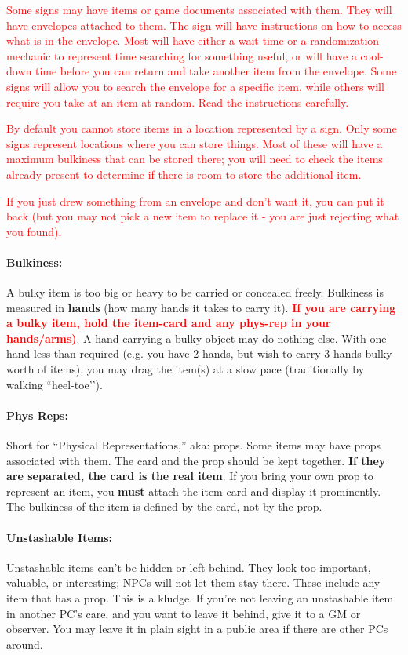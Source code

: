 \documentclass[sheet]{GL2020}
\begin{document}
\textcolor{red}{Some signs may have items or game documents associated with them. They will have envelopes attached to them. The sign will have instructions on how to access what is in the envelope. Most will have either a wait time or a randomization mechanic to represent time searching for something useful, or will have a cool-down time before you can return and take another item from the envelope. Some signs will allow you to search the envelope for a specific item, while others will require you take at an item at random. Read the instructions carefully.}

\textcolor{red}{By default you cannot store items in a location represented by a sign. Only some signs represent locations where you can store things. Most of these will have a maximum bulkiness that can be stored there; you will need to check the items already present to determine if there is room to store the additional item.}

\textcolor{red}{If you just drew something from an envelope and don't want it, you can put it back (but you may not pick a new item to replace it - you are just rejecting what you found).}

\paragraph{Bulkiness:} A bulky item is too big or heavy to be carried or concealed freely.  Bulkiness is measured in {\bf hands} (how many hands it takes to carry it).  \textcolor{red}{\textbf{If you are carrying a bulky item, hold the item-card and any phys-rep in your hands/arms)}}.  A hand carrying a bulky object may do nothing else.  With one hand less than required (e.g. you have 2 hands, but wish to carry 3-hands bulky worth of items), you may drag the item(s) at a slow pace (traditionally by walking ``heel-toe'’).

\paragraph{Phys Reps:} Short for ``Physical Representations,'' aka: props. Some items may have props associated with them.  The card and the prop should be kept together. \textbf{If they are separated, the card is the real item}. If you bring your own prop to represent an item, you \textbf{must} attach the item card and display it prominently. The bulkiness of the item is defined by the card, not by the prop.

\paragraph{Unstashable Items:} Unstashable items can't be hidden or left behind. They look too important, valuable, or interesting; NPCs will not let them stay there. These include any item that has a prop. This is a kludge. If you're not leaving an unstashable item in another PC's care, and you want to leave it behind, give it to a GM or observer. You may leave it in plain sight in a public area if there are other PCs around.
\end{document}
